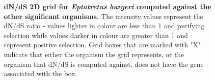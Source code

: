 \documentclass{article}
\begin{document}
\begin{figure}[H]
\centering
{}
\caption{\textbf{dN/dS 2D grid for \textit{Eptatretus burgeri} computed against the other significant organisms.} The intensity values represent the dN/dS ratio - values lighter in colour are less than 1 and purifying selection while values darker in colour are greater than 1 and represent positive selection. Grid boxes that are marked with "X" indicate that either the organism the grid represents, or the organism that dN/dS is computed against, does not have the gene associated with the box.}
\label{sup_fig_25}
\end{figure}
\end{document}
